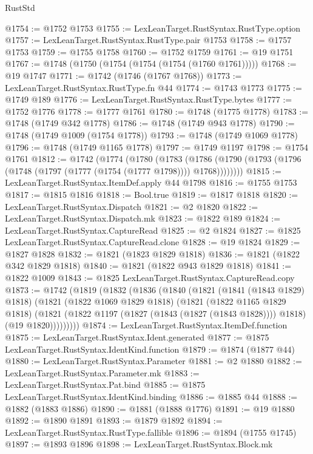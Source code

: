 \begin{lexlean}{RustStd}
\begin{coremodule}
{\begin{coremodule}
{{{{{{{{{{{{{{{{{{{{{{{{{{{{{{{{{{{{{{{{{{{@1754 := @1752 @1753
@1755 := LexLeanTarget.RustSyntax.RustType.option
@1757 := LexLeanTarget.RustSyntax.RustType.pair @1753
@1758 := @1757 @1753
@1759 := @1755 @1758
@1760 := @1752 @1759
@1761 := @19 @1751
@1767 := @1748 (@1750 (@1754 (@1754 (@1754 (@1760 @1761)))))
@1768 := @19 @1747
@1771 := @1742 (@1746 (@1767 @1768))
@1773 := LexLeanTarget.RustSyntax.RustType.fn @44
@1774 := @1743 @1773
@1775 := @1749 @189
@1776 := LexLeanTarget.RustSyntax.RustType.bytes
@1777 := @1752 @1776
@1778 := @1777 @1761
@1780 := @1748 (@1775 @1778)
@1783 := @1748 (@1749 @342 @1778)
@1786 := @1748 (@1749 @943 @1778)
@1790 := @1748 (@1749 @1009 (@1754 @1778))
@1793 := @1748 (@1749 @1069 @1778)
@1796 := @1748 (@1749 @1165 @1778)
@1797 := @1749 @1197
@1798 := @1754 @1761
@1812 := @1742
    (@1774
      (@1780
        (@1783
          (@1786 (@1790 (@1793 (@1796 (@1748 (@1797 (@1777 (@1754 (@1777 @1798)))) @1768))))))))
@1815 := LexLeanTarget.RustSyntax.ItemDef.apply @44 @1798
@1816 := @1755 @1753
@1817 := @1815 @1816
@1818 := Bool.true
@1819 := @1817 @1818
@1820 := LexLeanTarget.RustSyntax.Dispatch
@1821 := @2 @1820
@1822 := LexLeanTarget.RustSyntax.Dispatch.mk
@1823 := @1822 @189
@1824 := LexLeanTarget.RustSyntax.CaptureRead
@1825 := @2 @1824
@1827 := @1825 LexLeanTarget.RustSyntax.CaptureRead.clone
@1828 := @19 @1824
@1829 := @1827 @1828
@1832 := @1821 (@1823 @1829 @1818)
@1836 := @1821 (@1822 @342 @1829 @1818)
@1840 := @1821 (@1822 @943 @1829 @1818)
@1841 := @1822 @1009
@1843 := @1825 LexLeanTarget.RustSyntax.CaptureRead.copy
@1873 := @1742
    (@1819
      (@1832
        (@1836
          (@1840
            (@1821
              (@1841 (@1843 @1829) @1818)
              (@1821
                (@1822 @1069 @1829 @1818)
                (@1821
                  (@1822 @1165 @1829 @1818)
                  (@1821
                    (@1822 @1197 (@1827 (@1843 (@1827 (@1843 @1828)))) @1818)
                    (@19 @1820)))))))))
@1874 := LexLeanTarget.RustSyntax.ItemDef.function
@1875 := LexLeanTarget.RustSyntax.Ident.generated
@1877 := @1875 LexLeanTarget.RustSyntax.IdentKind.function
@1879 := @1874 (@1877 @44)
@1880 := LexLeanTarget.RustSyntax.Parameter
@1881 := @2 @1880
@1882 := LexLeanTarget.RustSyntax.Parameter.mk
@1883 := LexLeanTarget.RustSyntax.Pat.bind
@1885 := @1875 LexLeanTarget.RustSyntax.IdentKind.binding
@1886 := @1885 @44
@1888 := @1882 (@1883 @1886)
@1890 := @1881 (@1888 @1776)
@1891 := @19 @1880
@1892 := @1890 @1891
@1893 := @1879 @1892
@1894 := LexLeanTarget.RustSyntax.RustType.fallible
@1896 := @1894 (@1755 @1745)
@1897 := @1893 @1896
@1898 := LexLeanTarget.RustSyntax.Block.mk
}}}}}}}}}}}}}}}}}}}}}}}}}}}}}}}}}}}}}}}}}}}
\end{coremodule}}
\end{coremodule}
\end{lexlean}
